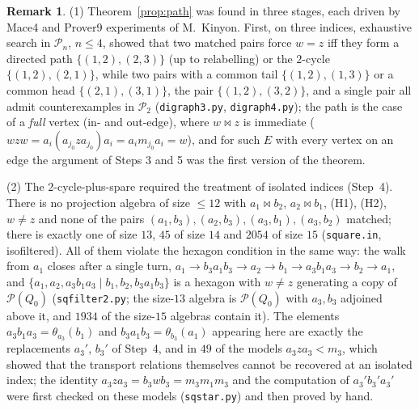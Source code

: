 \documentclass[11pt]{amsart}
\theoremstyle{definition}
\newtheorem{remark}[theorem]{Remark}
\renewcommand{\P}{\mathcal{P}}
\begin{document}
\begin{remark}\label{rem:path}
(1) Theorem~\ref{prop:path} was found in three stages, each driven by Mace4 and Prover9 experiments of M.~Kinyon. First, on three indices, exhaustive search in $\P_n$, $n\le4$, showed that two matched pairs force $w=z$ iff they form a directed path $\{(1,2),(2,3)\}$ (up to relabelling) or the $2$-cycle $\{(1,2),(2,1)\}$, while two pairs with a common tail $\{(1,2),(1,3)\}$ or a common head $\{(2,1),(3,1)\}$, the pair $\{(1,2),(3,2)\}$, and a single pair all admit counterexamples in $\P_2$ (\texttt{digraph3.py}, \texttt{digraph4.py}); the path is the case of a \emph{full} vertex (in- and out-edge), where $w\bowtie z$ is immediate ($wzw=a_i(a_{j_0}za_{j_0})a_i=a_im_{j_0}a_i=w$), and for such $E$ with every vertex on an edge the argument of Steps 3 and 5 was the first version of the theorem.

(2) The $2$-cycle-plus-spare required the treatment of isolated indices (Step~4). There is no projection algebra of size $\le12$ with $a_1\bowtie b_2$, $a_2\bowtie b_1$, (H1), (H2), $w\ne z$ and none of the pairs $(a_1,b_3),(a_2,b_3),(a_3,b_1),(a_3,b_2)$ matched; there is exactly one of size $13$, $45$ of size $14$ and $2054$ of size $15$ (\texttt{square.in}, isofiltered). All of them violate the hexagon condition in the same way: the walk from $a_1$ closes after a single turn, $a_1\to b_3a_1b_3\to a_2\to b_1\to a_3b_1a_3\to b_2\to a_1$, and $\{a_1,a_2,a_3b_1a_3\mid b_1,b_2,b_3a_1b_3\}$ is a hexagon with $w\ne z$ generating a copy of $\P(Q_0)$ (\texttt{sqfilter2.py}; the size-$13$ algebra is $\P(Q_0)$ with $a_3,b_3$ adjoined above it, and $1934$ of the size-$15$ algebras contain it). The elements $a_3b_1a_3=\theta_{a_3}(b_1)$ and $b_3a_1b_3=\theta_{b_3}(a_1)$ appearing here are exactly the replacements $a_3'$, $b_3'$ of Step~4, and in $49$ of the models $a_3za_3<m_3$, which showed that the transport relations themselves cannot be recovered at an isolated index; the identity $a_3za_3=b_3wb_3=m_3m_1m_3$ and the computation of $a_3'b_3'a_3'$ were first checked on these models (\texttt{sqstar.py}) and then proved by hand.


\end{remark}
\end{document}
